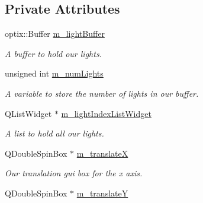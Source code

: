 \subsection*{Private Attributes}
\begin{DoxyCompactItemize}
\item 
\hypertarget{class_light_manager_adf0c079124707803ea2e0a96b67eb68c}{optix\-::\-Buffer \hyperlink{class_light_manager_adf0c079124707803ea2e0a96b67eb68c}{m\-\_\-light\-Buffer}}\label{class_light_manager_adf0c079124707803ea2e0a96b67eb68c}

\begin{DoxyCompactList}\small\item\em A buffer to hold our lights. \end{DoxyCompactList}\item 
\hypertarget{class_light_manager_aba2dca016525dace316ce7c3b38f5f99}{unsigned int \hyperlink{class_light_manager_aba2dca016525dace316ce7c3b38f5f99}{m\-\_\-num\-Lights}}\label{class_light_manager_aba2dca016525dace316ce7c3b38f5f99}

\begin{DoxyCompactList}\small\item\em A variable to store the number of lights in our buffer. \end{DoxyCompactList}\item 
\hypertarget{class_light_manager_a5ac6ccaa5449249f75536df87c0709a9}{Q\-List\-Widget $\ast$ \hyperlink{class_light_manager_a5ac6ccaa5449249f75536df87c0709a9}{m\-\_\-light\-Index\-List\-Widget}}\label{class_light_manager_a5ac6ccaa5449249f75536df87c0709a9}

\begin{DoxyCompactList}\small\item\em A list to hold all our lights. \end{DoxyCompactList}\item 
\hypertarget{class_light_manager_a1d232847280fef0ad277c27bf7c2ec5e}{Q\-Double\-Spin\-Box $\ast$ \hyperlink{class_light_manager_a1d232847280fef0ad277c27bf7c2ec5e}{m\-\_\-translate\-X}}\label{class_light_manager_a1d232847280fef0ad277c27bf7c2ec5e}

\begin{DoxyCompactList}\small\item\em Our translation gui box for the x axis. \end{DoxyCompactList}\item 
\hypertarget{class_light_manager_a1129eb4551830ded49621b7a35638315}{Q\-Double\-Spin\-Box $\ast$ \hyperlink{class_light_manager_a1129eb4551830ded49621b7a35638315}{m\-\_\-translate\-Y}}\label{class_light_manager_a1129eb4551830ded49621b7a35638315}


\end{DoxyCompactItemize}
